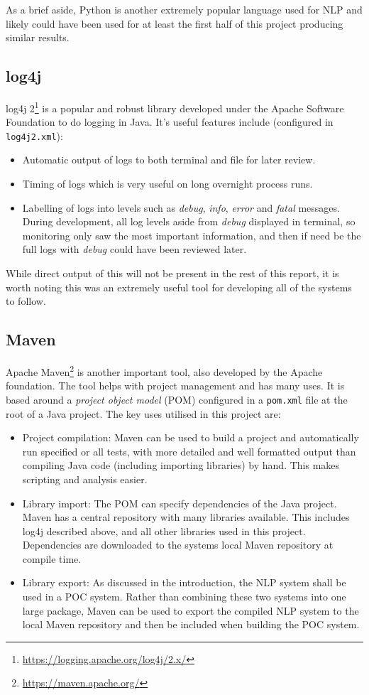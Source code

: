 As a brief aside, Python is another extremely popular language used for NLP and likely could have been used for at least the first half of this project producing similar results.

\subsection*{log4j}
log4j 2\footnote{\href{https://logging.apache.org/log4j/2.x/}{https://logging.apache.org/log4j/2.x/}} is a popular and robust library developed under the Apache Software Foundation to do logging in Java. It's useful features include (configured in \texttt{log4j2.xml}):
\begin{itemize}
	\item Automatic output of logs to both terminal and file for later review.
	\item Timing of logs which is very useful on long overnight process runs.
	\item Labelling of logs into levels such as \textit{debug}, \textit{info}, \textit{error} and \textit{fatal} messages. During development, all log levels aside from \textit{debug} displayed in terminal, so monitoring only saw the most important information, and then if need be the full logs with \textit{debug} could have been reviewed later.
\end{itemize}

While direct output of this will not be present in the rest of this report, it is worth noting this was an extremely useful tool for developing all of the systems to follow. 

\subsection*{Maven}
Apache Maven\footnote{\href{https://maven.apache.org/}{https://maven.apache.org/}} is another important tool, also developed by the Apache foundation. The tool helps with project management and has many uses. It is based around a \textit{project object model} (POM) configured in a \texttt{pom.xml} file at the root of a Java project. The key uses utilised in this project are:
\begin{itemize}
	\item Project compilation: Maven can be used to build a project and automatically run specified or all tests, with more detailed and well formatted output than compiling Java code (including importing libraries) by hand. This makes scripting and analysis easier.
	\item Library import: The POM can specify dependencies of the Java project. Maven has a central repository with many libraries available. This includes log4j described above, and all other libraries used in this project. Dependencies are downloaded to the systems local Maven repository at compile time.
	\item Library export: As discussed in the introduction, the NLP system shall be used in a POC system. Rather than combining these two systems into one large package, Maven can be used to export the compiled NLP system to the local Maven repository and then be included when building the POC system.
\end{itemize}

